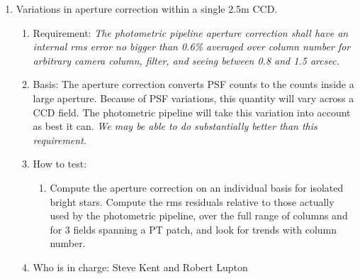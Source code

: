 \begin{enumerate}
\item Variations in aperture correction within a single 2.5m CCD.
   \begin{enumerate}
   \item Requirement: {\it The photometric pipeline aperture
	correction shall have an internal rms error no bigger than
	0.6\% averaged over column number for arbitrary camera column,
	filter, 
	and seeing between 0.8 and 1.5 arcsec.}
   \item Basis: The aperture correction converts PSF counts to the counts inside a
	large aperture.  Because of PSF variations, this quantity will
	vary across a CCD field.  The photometric pipeline will
	take this variation into account as best it can.  {\it We may
	be able to do substantially better than this requirement.}
   \item How to test:
	\begin{enumerate}
	\item Compute the aperture correction on an individual basis for isolated bright
	   stars.  Compute the rms residuals relative to those
	   actually used by the photometric pipeline, over the full
	   range of columns and for 3 fields spanning a PT patch, and
	   look for trends with column number. 
	\end{enumerate}
   \item Who is in charge: Steve Kent and Robert Lupton
   \end{enumerate}


\end{enumerate}

